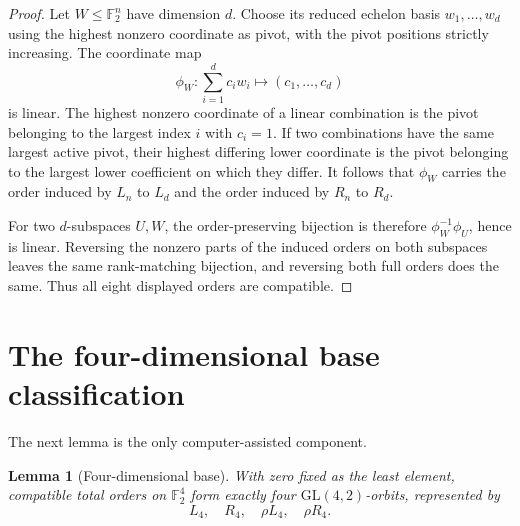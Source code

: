 \documentclass[11pt]{article}
\newtheorem{lemma}[theorem]{Lemma}
\begin{document}
\begin{proof}
Let $W\le\mathbb F_2^n$ have dimension $d$. Choose its reduced echelon basis
$w_1,\ldots,w_d$ using the highest nonzero coordinate as pivot, with the pivot
positions strictly increasing. The coordinate map
\[
\phi_W:\sum_{i=1}^dc_iw_i\longmapsto(c_1,\ldots,c_d)
\]
is linear. The highest nonzero coordinate of a linear combination is the
pivot belonging to the largest index $i$ with $c_i=1$. If two combinations
have the same largest active pivot, their highest differing lower coordinate
is the pivot belonging to the largest lower coefficient on which they differ.
It follows that $\phi_W$ carries the order induced by $L_n$ to $L_d$ and the
order induced by $R_n$ to $R_d$.

For two $d$-subspaces $U,W$, the order-preserving bijection is therefore
$\phi_W^{-1}\phi_U$, hence is linear. Reversing the nonzero parts of the
induced orders on both subspaces leaves the same rank-matching bijection, and
reversing both full orders does the same. Thus all eight displayed orders are
compatible.
\end{proof}

\section{The four-dimensional base classification}

The next lemma is the only computer-assisted component.

\begin{lemma}[Four-dimensional base]\label{lem:four}
With zero fixed as the least element, compatible total orders on
$\mathbb F_2^4$ form exactly four $\mathrm{GL}(4,2)$-orbits, represented by
\[
L_4,\quad R_4,\quad \rho L_4,\quad \rho R_4.
\]
\end{lemma}
\end{document}
